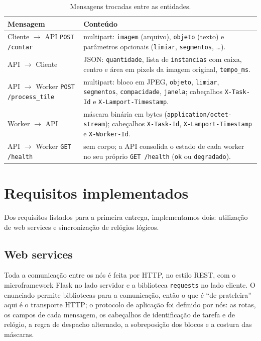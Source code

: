 \documentclass{sbc2023}
\begin{document}
\begin{table}[t]
\caption{Mensagens trocadas entre as entidades.}
\label{tab:mensagens}
\footnotesize
\begin{tabular}{@{}>{\raggedright\arraybackslash}p{2.35cm}>{\raggedright\arraybackslash}p{5.6cm}@{}}
\toprule
\textbf{Mensagem} & \textbf{Conteúdo} \\
\midrule
Cliente $\to$ API \newline \texttt{POST /contar} & multipart: \texttt{imagem} (arquivo), \texttt{objeto} (texto) e parâmetros opcionais (\texttt{limiar}, \texttt{segmentos}, \ldots). \\
\addlinespace
API $\to$ Cliente & JSON: \texttt{quantidade}, lista de \texttt{instancias} com caixa, centro e área em pixels da imagem original, \texttt{tempo\_ms}. \\
\addlinespace
API $\to$ Worker \newline \texttt{POST} \newline \texttt{/process\_tile} & multipart: bloco em JPEG, \texttt{objeto}, \texttt{limiar}, \texttt{segmentos}, \texttt{compacidade}, \texttt{janela}; cabeçalhos \texttt{X-Task-Id} e \texttt{X-Lamport-Timestamp}. \\
\addlinespace
Worker $\to$ API & máscara binária em bytes (\texttt{application/octet-stream}); cabeçalhos \texttt{X-Task-Id}, \texttt{X-Lamport-Timestamp} e \texttt{X-Worker-Id}. \\
\addlinespace
API $\to$ Worker \newline \texttt{GET /health} & sem corpo; a API consolida o estado de cada worker no seu próprio \texttt{GET /health} (\texttt{ok} ou \texttt{degradado}). \\
\bottomrule
\end{tabular}
\end{table}

\section{Requisitos implementados}
\label{sec:requisitos}

Dos requisitos listados para a primeira entrega, implementamos dois: utilização de web services e sincronização de relógios lógicos.

\subsection{Web services}

Toda a comunicação entre os nós é feita por HTTP, no estilo REST, com o microframework Flask no lado servidor e a biblioteca \texttt{requests} no lado cliente. O enunciado permite bibliotecas para a comunicação, então o que é ``de prateleira'' aqui é o transporte HTTP; o protocolo de aplicação foi definido por nós: as rotas, os campos de cada mensagem, os cabeçalhos de identificação de tarefa e de relógio, a regra de despacho alternado, a sobreposição dos blocos e a costura das máscaras.
\end{document}
